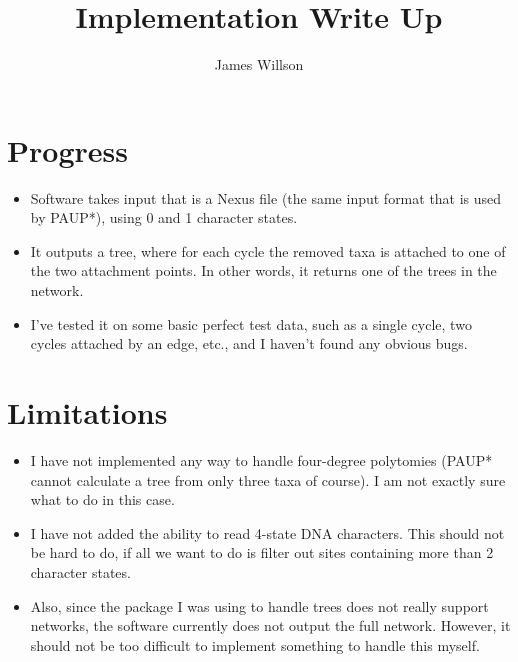 \documentclass[11pt]{article}
\title{Implementation Write Up}
\author{James Willson}
\begin{document}
\maketitle
\section{Progress}
\begin{itemize}
	\item Software takes input that is a Nexus file (the same input format that is used by PAUP*), using 0 and 1 character states. 
	\item It outputs a tree, where for each cycle the removed taxa is attached to one of the two attachment points. In other words, it returns one of the trees in the network.
	\item I've tested it on some basic perfect test data, such as a single cycle, two cycles attached by an edge, etc., and I haven't found any obvious bugs. 
\end{itemize}

\section{Limitations}
\begin{itemize}
	\item I have not implemented any way to handle four-degree polytomies (PAUP* cannot calculate a tree from only three taxa of course). I am not exactly sure what to do in this case.
	\item I have not added the ability to read 4-state DNA characters. This should not be hard to do, if all we want to do is filter out sites containing more than 2 character states.
	\item Also, since the package I was using to handle trees does not really support networks, the software currently does not output the full network. However, it should not be too difficult to implement something to handle this myself.
\end{itemize}
\end{document}
